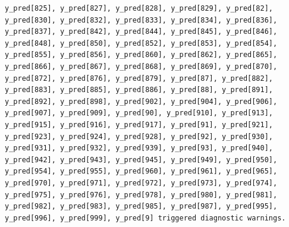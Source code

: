 \documentclass[
  letterpaper,
  DIV=11,
  numbers=noendperiod]{scrartcl}
\begin{document}
\begin{verbatim}
y_pred[825], y_pred[827], y_pred[828], y_pred[829], y_pred[82],
y_pred[830], y_pred[832], y_pred[833], y_pred[834], y_pred[836],
y_pred[837], y_pred[842], y_pred[844], y_pred[845], y_pred[846],
y_pred[848], y_pred[850], y_pred[852], y_pred[853], y_pred[854],
y_pred[855], y_pred[856], y_pred[860], y_pred[862], y_pred[865],
y_pred[866], y_pred[867], y_pred[868], y_pred[869], y_pred[870],
y_pred[872], y_pred[876], y_pred[879], y_pred[87], y_pred[882],
y_pred[883], y_pred[885], y_pred[886], y_pred[88], y_pred[891],
y_pred[892], y_pred[898], y_pred[902], y_pred[904], y_pred[906],
y_pred[907], y_pred[909], y_pred[90], y_pred[910], y_pred[913],
y_pred[915], y_pred[916], y_pred[917], y_pred[91], y_pred[921],
y_pred[923], y_pred[924], y_pred[928], y_pred[92], y_pred[930],
y_pred[931], y_pred[932], y_pred[939], y_pred[93], y_pred[940],
y_pred[942], y_pred[943], y_pred[945], y_pred[949], y_pred[950],
y_pred[954], y_pred[955], y_pred[960], y_pred[961], y_pred[965],
y_pred[970], y_pred[971], y_pred[972], y_pred[973], y_pred[974],
y_pred[975], y_pred[976], y_pred[978], y_pred[980], y_pred[981],
y_pred[982], y_pred[983], y_pred[985], y_pred[987], y_pred[995],
y_pred[996], y_pred[999], y_pred[9] triggered diagnostic warnings.
 

\end{verbatim}
\end{document}
